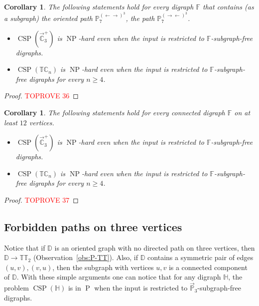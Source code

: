 \documentclass{article}
\newtheorem{corollary}[theorem]{Corollary}
\theoremstyle{definition}
\theoremstyle{remark}
\DeclareMathOperator{\NP}{NP}
\DeclareMathOperator{\cP}{P}
\DeclareMathOperator{\CSP}{CSP}
\newcommand{\bC}{{\mathbb C}}
\newcommand{\bD}{{\mathbb D}}
\newcommand{\bF}{{\mathbb F}}
\newcommand{\bH}{{\mathbb H}}
\newcommand{\bP}{{\mathbb P}}
\newcommand{\bT}{{\mathbb T}}
\begin{document}
\begin{corollary}\label{cor:P8-alternation}
    The following statements hold for every digraph $\bF$ that contains (as a subgraph)
    the oriented path $\bP_7^{(\leftarrow\rightarrow)^3}$, the path
    $\bP_7^{(\rightarrow\leftarrow)^3}$.
    \begin{itemize}
        \item $\CSP(\vec{\bC}_3^+)$ is $\NP$-hard even when the input is restricted to $\bF$-subgraph-free digraphs.
        \item $\CSP(\bT\bC_n)$ is $\NP$-hard even when the input is restricted to $\bF$-subgraph-free digraphs
        for every $n\ge 4$.
    \end{itemize}
\end{corollary}
\begin{proof}\textcolor{red}{TOPROVE 36}\end{proof}

\begin{corollary}\label{cor:bounded-size}
    The following statements hold for every connected digraph $\bF$ on at least $12$ vertices.
    \begin{itemize}
        \item $\CSP(\vec{\bC}_3^+)$ is $\NP$-hard even when the input is restricted to $\bF$-subgraph-free digraphs.
        \item $\CSP(\bT\bC_n)$ is $\NP$-hard even when the input is restricted to $\bF$-subgraph-free digraphs for every $n\ge 4$.
    \end{itemize}
\end{corollary}
\begin{proof}\textcolor{red}{TOPROVE 37}\end{proof}




 
\subsection*{Forbidden paths on three vertices}

Notice that if $\bD$ is an oriented graph with no directed path on three vertices, 
then $\bD\to \bT\bT_2$ (Observation~\ref{obs:P-TT}). Also, if $\bD$ contains a
symmetric pair of edges $(u,v),(v,u)$, then the subgraph with vertices $u,v$
is a connected component of $\bD$. With these simple arguments one can notice
that for any digraph $\bH$, the problem $\CSP(\bH)$ is in $\cP$ when the
input is restricted to $\vec{\bP}_3$-subgraph-free digraphs.
\end{document}

